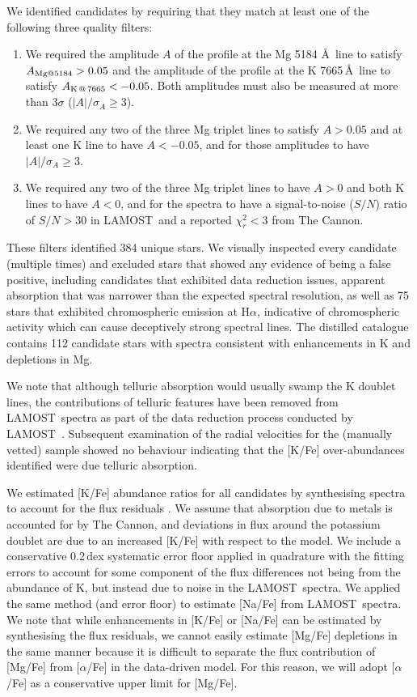 \documentclass[a4paper,fleqn,usenatbib]{mnras}
\newcommand{\project}[1]{#1}
\newcommand{\lamost}{\project{LAMOST}}
\newcommand{\tc}{\project{The Cannon}}
\begin{document}
We identified candidates by requiring that they match at least one of the following three quality filters:
\begin{enumerate}
\item We required the amplitude $A$ of the profile at the Mg 5184 \AA \ line to satisfy $A_{{\rm Mg} @ 5184} > 0.05$ and the amplitude of the profile at the K 7665\,\AA\ line to satisfy $A_{{\rm K}\,@\,7665} < -0.05$. Both amplitudes must also be measured at more than $3\sigma$ ($|A|/\sigma_{A} \geq 3$).
\item We required any two of the three Mg triplet lines to satisfy $A > 0.05$ and at least one K line to have $A < -0.05$, and for those amplitudes to have $|A|/\sigma_{A} \geq 3$.
\item We required any two of the three Mg triplet lines to have $A > 0$ and both K lines to have $A < 0$, and for the spectra to have a signal-to-noise ($S/N$) ratio of $S/N > 30$ in \lamost\ and a reported $\chi_{r}^2 < 3$ from \tc.
\end{enumerate} 
 
These filters identified 384 unique stars. We visually inspected every candidate (multiple times) and excluded stars that showed any evidence of being a false positive, including candidates that exhibited data reduction issues, apparent absorption that was narrower than the expected spectral resolution, as well as 75 stars that exhibited chromospheric emission at H$\alpha$, indicative of chromospheric activity which can cause deceptively strong spectral lines. The distilled catalogue contains 112 candidate stars with spectra consistent with enhancements in K and depletions in Mg.

We note that although telluric absorption would usually swamp the K doublet lines, the contributions of telluric features have been removed from \lamost\ spectra as part of the data reduction process conducted by \lamost\ \citep{luo2016vizier}. Subsequent examination of the radial velocities for the (manually vetted) sample showed no behaviour indicating that the [K/Fe] over-abundances identified were due telluric absorption.

We estimated [K/Fe] abundance ratios for all candidates by synthesising spectra to account for the flux residuals \citep{marcs,sme,vald,ispec}. We assume that absorption due to metals is accounted for by \tc, and deviations in flux around the potassium doublet are due to an increased [K/Fe] with respect to the model. We include a conservative 0.2\,dex systematic error floor applied in quadrature with the fitting errors to account for some component of the flux differences not being from the abundance of K, but instead due to noise in the \lamost\ spectra. We applied the same method (and error floor) to estimate [Na/Fe] from \lamost\ spectra. We note that while enhancements in [K/Fe] or [Na/Fe] can be estimated by synthesising the flux residuals, we cannot easily estimate [Mg/Fe] depletions in the same manner because it is difficult to separate the flux contribution of [Mg/Fe] from [$\alpha$/Fe] in the data-driven model. For this reason, we will adopt [$\alpha$/Fe] as a conservative upper limit for [Mg/Fe].
\end{document}
